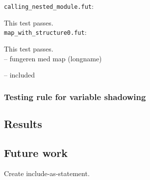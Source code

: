 \texttt{calling_nested_module.fut}:

This test passes.
\\
\texttt{map_with_structure0.fut}:

This test passes.
\\
-- fungeren med map (longname)

-- included
\subsubsection{Testing rule for variable shadowing}

\subsection{Results}
\label{subsec:label}

\subsection{Future work}
\label{subsec:structuresfuturework}
Create include-as-statement.

